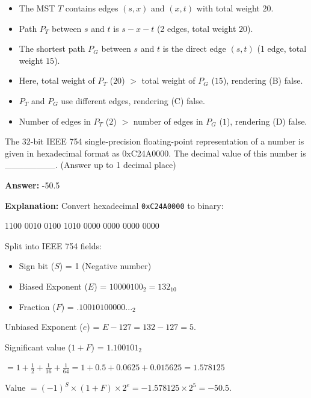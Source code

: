 \begin{tcolorbox}[enhanced,breakable,colback=boxgray,colframe=gray!45,boxrule=0.4pt,arc=2pt,left=6pt,right=6pt,top=4pt,bottom=4pt,title={Q.47},fonttitle=\bfseries\small,coltitle=black,colbacktitle=gray!15]
\begin{itemize}[leftmargin=1.4em,itemsep=1pt]
\item The MST $T$ contains edges $(s, x)$ and $(x, t)$ with total weight $20$.
\item Path $P_T$ between $s$ and $t$ is $s - x - t$ (2 edges, total weight $20$).
\item The shortest path $P_G$ between $s$ and $t$ is the direct edge $(s, t)$ (1 edge, total weight $15$).
\item Here, total weight of $P_T$ ($20$) $>$ total weight of $P_G$ ($15$), rendering (B) false.
\item $P_T$ and $P_G$ use different edges, rendering (C) false.
\item Number of edges in $P_T$ ($2$) $>$ number of edges in $P_G$ ($1$), rendering (D) false.
\end{itemize}
\end{tcolorbox}


\begin{tcolorbox}[enhanced,breakable,colback=boxgray,colframe=gray!45,boxrule=0.4pt,arc=2pt,left=6pt,right=6pt,top=4pt,bottom=4pt,title={Q.58},fonttitle=\bfseries\small,coltitle=black,colbacktitle=gray!15]
\small The 32-bit IEEE 754 single-precision floating-point representation of a number is given in hexadecimal format as 0xC24A0000. The decimal value of this number is \_\_\_\_\_\_\_\_. (Answer up to 1 decimal place)\par\par{}\par\smallskip\textbf{Answer:} -50.5\par\par\textbf{Explanation:} Convert hexadecimal \texttt{0xC24A0000} to binary:\par
1100 0010 0100 1010 0000 0000 0000 0000\par
Split into IEEE 754 fields:\par
\begin{itemize}[leftmargin=1.4em,itemsep=1pt]
\item Sign bit ($S$) = 1 (Negative number)
\item Biased Exponent ($E$) = $10000100_2 = 132_{10}$
\item Fraction ($F$) = $.10010100000..._2$
\end{itemize}
Unbiased Exponent ($e$) = $E - 127 = 132 - 127 = 5$.\par
Significant value ($1 + F$) = $1.100101_2$\par
$= 1 + \frac{1}{2} + \frac{1}{16} + \frac{1}{64} = 1 + 0.5 + 0.0625 + 0.015625 = 1.578125$\par
Value $= (-1)^S \times (1 + F) \times 2^e = -1.578125 \times 2^5 = -50.5$.\par
\end{tcolorbox}


